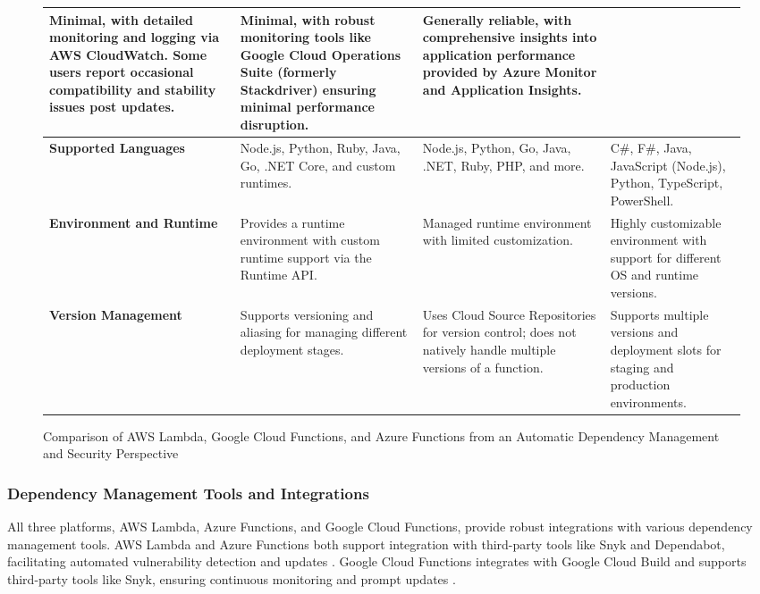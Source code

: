 \documentclass[sigconf]{acmart}
\begin{document}
\begin{figure*}[ht]
\begin{tabular}{|p{4cm}|p{4cm}|p{4cm}|p{4cm}|}
	Minimal, with detailed monitoring and logging via AWS CloudWatch. Some users report occasional compatibility and stability issues post updates. & 
	Minimal, with robust monitoring tools like Google Cloud Operations Suite (formerly Stackdriver) ensuring minimal performance disruption. & 
	Generally reliable, with comprehensive insights into application performance provided by Azure Monitor and Application Insights. \\
	\hline
	\textbf{Supported Languages} & 
	Node.js, Python, Ruby, Java, Go, .NET Core, and custom runtimes. & 
	Node.js, Python, Go, Java, .NET, Ruby, PHP, and more. & 
	C\#, F\#, Java, JavaScript (Node.js), Python, TypeScript, PowerShell. \\
	\hline
	\textbf{Environment and Runtime} & 
	Provides a runtime environment with custom runtime support via the Runtime API. & 
	Managed runtime environment with limited customization. & 
	Highly customizable environment with support for different OS and runtime versions. \\
	\hline
	\textbf{Version Management} & 
	Supports versioning and aliasing for managing different deployment stages. & 
	Uses Cloud Source Repositories for version control; does not natively handle multiple versions of a function. & 
	Supports multiple versions and deployment slots for staging and production environments. \\
	\hline
	\end{tabular}
	\caption{Comparison of AWS Lambda, Google Cloud Functions, and Azure Functions from an Automatic Dependency Management and Security Perspective}
	\label{fig:comparison}
	\end{figure*}
	

\subsubsection{Dependency Management Tools and Integrations}

All three platforms, AWS Lambda, Azure Functions, and Google Cloud Functions, provide robust integrations with various dependency management tools. AWS Lambda and Azure Functions both support integration with third-party tools like Snyk and Dependabot, facilitating automated vulnerability detection and updates \cite{awsCI2023, azureDevOps2023, googlesnyk2023}. Google Cloud Functions integrates with Google Cloud Build and supports third-party tools like Snyk, ensuring continuous monitoring and prompt updates \cite{googleBuild2023}.
\end{document}
